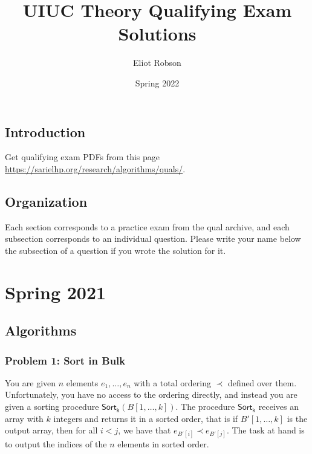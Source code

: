 \documentclass{article}
\title{UIUC Theory Qualifying Exam Solutions}
\author{Eliot Robson} %
\date{Spring 2022}
\newcommand{\Sortk}{\mathsf{Sort_k}}
\begin{document}
\maketitle


\tableofcontents

\subsection{Introduction}
Get qualifying exam PDFs from this page \url{https://sarielhp.org/research/algorithms/quals/}.

\subsection{Organization}
Each section corresponds to a practice exam from the qual archive, and each subsection corresponds to an individual question. Please write your name below the subsection of a question if you wrote the solution for it.

\section{Spring 2021}

\subsection{Algorithms}

\subsubsection{Problem 1: Sort in Bulk}
You are given \(n\) elements \(e_1, \dots, e_n\) with a total ordering \(\prec\) defined over them. Unfortunately, you have no access to the ordering directly, and instead you are given a sorting procedure \(\Sortk (B[1, \dots, k])\). The procedure \(\Sortk\) receives an array with \(k\) integers and returns it in a sorted order, that is if \(B'[1, \dots, k]\) is the output array, then for all \(i < j\), we have that \(e_{B'[i]} \prec e_{B'[j]}\). The task at hand is to output the indices of the \(n\) elements in sorted order.
\end{document}
